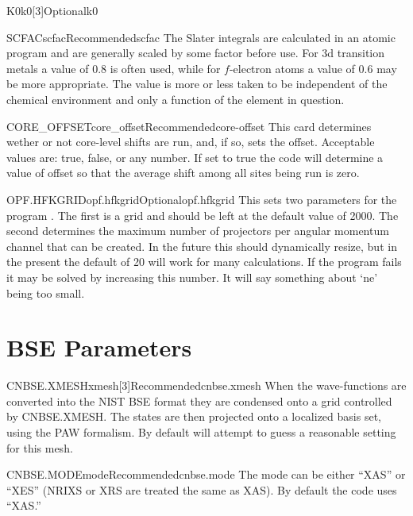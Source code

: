 \documentclass[11pt]{report}
\begin{document}
\begin{Card}{K0}{k0[3]}{Optional}{k0}
\begin{Card}{SCFAC}{scfac}{Recommended}{scfac}
The Slater integrals are calculated in an atomic program and are generally scaled by some factor before use. For 3d transition metals a value of $0.8$ is often used, while for $f$-electron atoms a value of $0.6$ may be more appropriate. The value is more or less taken to be independent of the chemical environment and only a function of the element in question.
\end{Card}

\begin{Card}{CORE\_OFFSET}{core\_offset}{Recommended}{core-offset}
This card determines wether or not core-level shifts are run, and, if so, sets the offset. Acceptable values are: true, false, or any number. If set to true the code will determine a value of offset so that the average shift among all sites being run is zero. 
\end{Card}

\begin{Card}{OPF.HFKGRID}{opf.hfkgrid}{Optional}{opf.hfkgrid}
This sets two parameters for the program . The first is a grid and should be left at the default value of 2000. The second determines the maximum number of projectors per angular momentum channel that can be created. In the future this should dynamically resize, but in the present the default of 20 will work for many calculations. If the program  fails it may be solved by increasing this number. It will say something about `ne' being too small. 
\end{Card}


\section{BSE Parameters}
\label{sec:BSE-Parameters}

\begin{Card}{CNBSE.XMESH}{xmesh[3]}{Recommended}{cnbse.xmesh}
When the wave-functions are converted into the NIST BSE format they are condensed onto a grid controlled by CNBSE.XMESH. The states are then projected onto a localized basis set, using the PAW formalism. By default  will attempt to guess a reasonable 
setting for this mesh. 
\end{Card}

\begin{Card}{CNBSE.MODE}{mode}{Recommended}{cnbse.mode}
The mode can be either ``XAS'' or ``XES'' (NRIXS or XRS are treated the same as XAS). By default the code uses ``XAS.''
\end{Card}


\end{Card}
\end{document}
